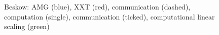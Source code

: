 \documentclass{sig-alternate}
\begin{document}
\begin{figure}
{  }
\caption{Beskow: AMG ({\color{blue}blue}), XXT ({\color{red}red}), communication (dashed),
  computation (single), communication (ticked), computational linear scaling
  ({\color{green}green})}
\label{fig:scaling_beskow}
\end{figure}
\end{document}
